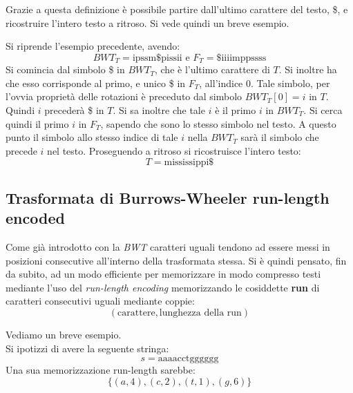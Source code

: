 Grazie a questa definizione è possibile partire dall'ultimo carattere del testo,
\$, e ricostruire l'intero testo a ritroso. Si vede quindi un breve esempio.
\begin{esempio}
  Si riprende l'esempio precedente, avendo:
  \[BWT_T=\mbox{ipssm\$pissii}\mbox{ e }F_T=\mbox{\$iiiimppssss}\]
  Si comincia dal simbolo \$ in $BWT_T$, che è l'ultimo carattere di $T$. Si
  inoltre ha che esso corrisponde al primo, e unico \$ in $F_T$, all'indice
  $0$. Tale simbolo, per l'ovvia proprietà delle rotazioni è preceduto dal
  simbolo $BWT_T[0]=i$ in $T$. Quindi $i$ precederà \$ in $T$. Si sa inoltre che
  tale $i$ è il primo $i$ in $BWT_T$. Si cerca quindi il primo $i$ in $F_T$,
  sapendo che sono lo stesso simbolo nel testo. A questo punto il simbolo allo
  stesso indice di tale $i$ nella $BWT_T$ sarà il simbolo che precede $i$ nel
  testo. Proseguendo a ritroso si ricostruisce l'intero testo:
  \[T=\mbox{mississippi\$}\]
\end{esempio}
\subsection{Trasformata di Burrows-Wheeler run-length encoded}
Come già introdotto con la \textit{BWT} caratteri uguali tendono ad essere messi
in posizioni consecutive all'interno della trasformata stessa. Si è quindi
pensato, fin da subito, ad un modo efficiente per memorizzare in modo compresso
testi mediante l'uso del \textit{run-length encoding} memorizzando le cosiddette
\textbf{run} di caratteri consecutivi uguali mediante coppie:
\[(\mbox{carattere}, \mbox{lunghezza della run})\]
\begin{esempio}
  Vediamo un breve esempio.\\
  Si ipotizzi di avere la seguente stringa:
  \[s=\mbox{aaaacctgggggg}\]
  Una sua memorizzazione run-length sarebbe:
  \[\{(a,4),(c,2),(t,1),(g,6)\}\]
\end{esempio}
